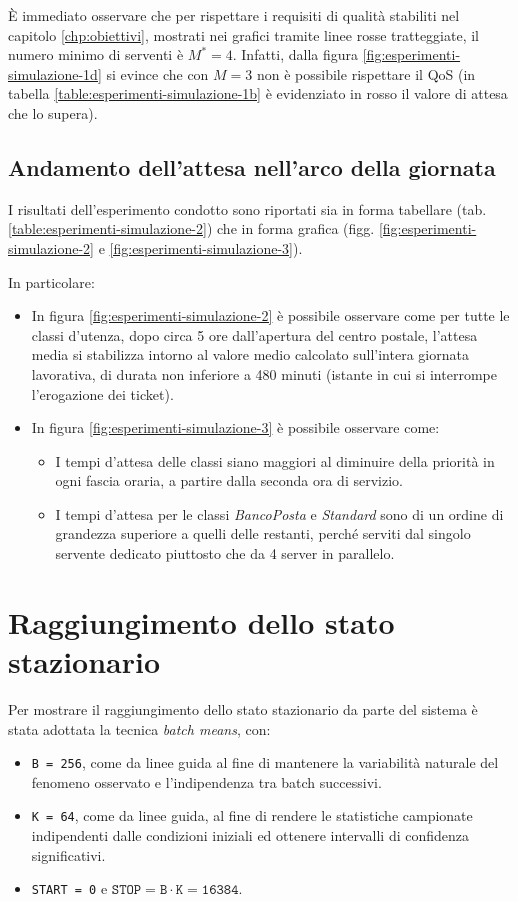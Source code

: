 È immediato osservare che per rispettare i requisiti di qualità stabiliti nel capitolo \ref{chp:obiettivi}, mostrati nei grafici tramite linee rosse tratteggiate, il numero minimo di serventi è $M^* = 4$. Infatti, dalla figura \ref{fig:esperimenti-simulazione-1d} si evince che con $M = 3$ non è possibile rispettare il QoS (in tabella \ref{table:esperimenti-simulazione-1b} è evidenziato in {\color{red}rosso} il valore di  attesa che lo supera).

\subsection*{Andamento dell'attesa nell'arco della giornata}
I risultati dell'esperimento condotto sono riportati sia in forma tabellare (tab. \ref{table:esperimenti-simulazione-2}) che in forma grafica (figg. \ref{fig:esperimenti-simulazione-2} e \ref{fig:esperimenti-simulazione-3}).

In particolare:
\begin{itemize}
\item In figura \ref{fig:esperimenti-simulazione-2} è possibile osservare come per tutte le classi d'utenza, dopo circa 5 ore dall'apertura del centro postale, l'attesa media si stabilizza intorno al valore medio calcolato sull'intera giornata lavorativa, di durata non inferiore a 480 minuti (istante in cui si interrompe l'erogazione dei ticket).
\item In figura \ref{fig:esperimenti-simulazione-3} è possibile osservare come:
\begin{itemize}
\item I tempi d'attesa delle classi siano maggiori al diminuire della priorità in ogni fascia oraria, a partire dalla seconda ora di servizio.
\item I tempi d'attesa per le classi \sr{} \textsl{BancoPosta} e \textsl{Standard} sono di un ordine di grandezza superiore a quelli delle restanti, perché serviti dal singolo servente dedicato piuttosto che da 4 server in parallelo.
\end{itemize}
\end{itemize}

\section{Raggiungimento dello stato stazionario}\label{sec:esperimenti-simulazione-stazionario}
Per mostrare il raggiungimento dello stato stazionario da parte del sistema è stata adottata la tecnica \textit{batch means}, con:
\begin{itemize}
\item \texttt{B = 256}, come da linee guida al fine di mantenere la variabilità naturale del fenomeno osservato e l'indipendenza tra batch successivi.
\item \texttt{K = 64}, come da linee guida, al fine di rendere le statistiche campionate indipendenti dalle condizioni iniziali ed ottenere intervalli di confidenza significativi.
\item \texttt{START = 0} e $\mathtt{STOP = B \cdot K = 16384}$.
\end{itemize}

